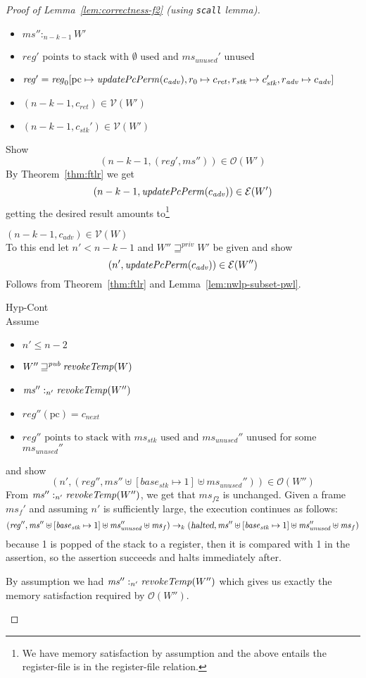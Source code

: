 \documentclass[a4paper]{article}
\newcommand{\var}[1]{\mathit{#1}}
\newcommand{\hs}{\var{ms}}
\newcommand{\ms}{\hs}
\newcommand{\pcreg}{\mathrm{pc}}
\newcommand{\start}{\var{base}}
\newcommand{\reg}{\var{reg}}
\newcommand{\heap}{\var{mem}}
\newcommand{\adv}{\var{adv}}
\newcommand{\stk}{\var{stk}}
\newcommand{\halted}{\textsl{halted}}
\newcommand{\plainfun}[2]{
  \ifthenelse{\equal{#2}{}}
  {\mathit{#1}}
  {\mathit{#1}(#2)}
}
\newcommand{\updatePcPerm}[1]{\plainfun{updatePcPerm}{#1}}
\newcommand{\revokeTemp}[1]{\plainfun{revokeTemp}{#1}}
\newcommand{\futurewk}{\mathbin{\sqsupseteq}^{\var{pub}}}
\newcommand{\futurestr}{\mathbin{\sqsupseteq}^{\var{priv}}}
\newcommand{\heapSat}[3][\heap]{#1 :_{#2} #3}
\newcommand{\memSat}[3][n]{\heapSat[#2]{#1}{#3}}
\newcommand{\asmType}{\plaindom{AsmType}}
\newcommand{\plaindom}[1]{\mathrm{#1}}
\newcommand{\intr}[2]{\mathcal{#1}}
\newcommand{\valueintr}[1]{\intr{V}{#1}}
\newcommand{\exprintr}[1]{\intr{E}{#1}}
\newcommand{\stdvr}{\valueintr{\asmType}}
\newcommand{\stder}{\exprintr{\asmType}}
\newcommand{\observations}{\mathcal{O}}
\newcommand{\npair}[2][n]{\left(#1,#2 \right)}
\newcommand{\step}[1][]{\rightarrow_{#1}}
\begin{document}
\begin{proof}[Proof of Lemma~\ref{lem:correctness-f2} (using \texttt{scall} lemma)]
\begin{enumproof}
\begin{itemize}
    \item $\memSat[n-k-1]{\ms''}{W'}$
    \item $\reg' \text{ points to stack with $\emptyset$ used and $\ms_{\mathit{unused}}'$ unused}$
    \item $\reg'= \reg_0[\pcreg\mapsto\updatePcPerm{c_\adv},r_0 \mapsto c_{\mathit{ret}}, r_\stk \mapsto c_\stk', r_\adv \mapsto c_\adv]$ 
    \item $\npair[n-k-1]{c_{\mathit{ret}}} \in \stdvr(W')$
    \item $\npair[n-k-1]{c_\stk'} \in \stdvr(W')$
    \end{itemize}
    Show
    \[
      (n-k-1,(\reg',\ms'')) \in \observations(W')
    \]
    By Theorem~\ref{thm:ftlr} we get
    \[
      \npair[n-k-1]{\updatePcPerm{c_\adv}} \in \stder(W')
    \]
    getting the desired result amounts to\footnote{We have memory satisfaction by assumption and the above entails the register-file is in the register-file relation.}
    \begin{enumproof}
      \item $\npair[n-k-1]{c_\adv} \in \stdvr(W)$ \\
        To this end let $n' < n-k-1$ and $W'' \futurestr W'$ be given and show
        \[
          \npair[n']{\updatePcPerm{c_\adv}} \in \stder(W'')
        \]
        Follows from Theorem~\ref{thm:ftlr} and Lemma~\ref{lem:nwlp-subset-pwl}.
    \end{enumproof}
  \item Hyp-Cont\\
    Assume
    \begin{itemize}
    \item $n' \leq n-2$
    \item $W'' \futurewk \revokeTemp{W}$
    \item $\memSat[n']{\ms''}{\revokeTemp{W''}}$ 
    \item $\reg''(\pcreg) = c_{\mathit{next}}$
   \item $\reg'' \text{ points to stack with $\ms_\stk$ used and $\ms_{\mathit{unused}}''$ unused}$ for some $\ms_{\mathit{unused}}''$
    \end{itemize}
    and show
    \[
      \npair[n']{(\reg'',\ms'' \uplus [\start_\stk \mapsto 1] \uplus \ms_{\var{unused}}'')} \in \observations(W'')
    \]
    From $\memSat[n']{\ms''}{\revokeTemp{W''}}$, we get that $\ms_{f2}$ is unchanged. Given a frame $\ms_f'$ and assuming $n'$ is sufficiently large, the execution continues as follows:
    \[
      (\reg'',\ms'' \uplus [\start_\stk \mapsto 1] \uplus \ms_{\var{unused}}'' \uplus \ms_f) \step[k] (\halted,\ms'' \uplus [\start_\stk \mapsto 1] \uplus \ms_{\var{unused}}'' \uplus \ms_f)
    \]
    because 1 is popped of the stack to a register, then it is compared with 1 in the assertion, so the assertion succeeds and halts immediately after.

    By assumption we had $\memSat[n']{\ms''}{\revokeTemp{W''}}$ which gives us exactly the memory satisfaction required by $\observations(W'')$.
  \end{enumproof}
\end{proof}
\end{document}
